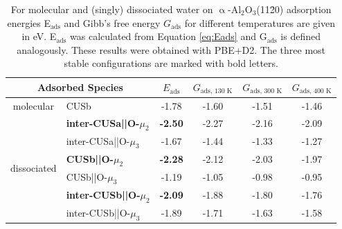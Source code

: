 \documentclass[11pt,DIV=13,BCOR=5mm,a4paper,headinclude]{scrbook}
\begin{document}
\begin{table}[!ht]
  \centering
 \caption{For molecular and (singly) dissociated water on $\upalpha$-Al$_2$O$_3$(11\=20) adsorption energies E$_\textrm{ads}$ and Gibb's free energy $G_\textrm{ads}$ for different temperatures are given in eV.
E$_\textrm{ads}$ was calculated from Equation \ref{eq:Eads} and G$_\textrm{ads}$ is defined analogously.
These results were obtained with PBE+D2.
The three most stable configurations are marked with bold letters.
\vspace*{.2cm} 
  }
  \begin{tabular}{cl|cccc}
  \toprule
   \multicolumn{2}{c|}{Adsorbed Species}  & $E_\text{ads}$ & $G_\text{ads, 130 K}$  &  $G_\text{ads, 300 K}$  & $G_\text{ads, 400 K}$ \\\midrule
\multirow{1}{*}{molecular} & CUSb          &   -1.78  &-1.60 & -1.51  & -1.46 \\\hline
 \multirow{6}{*}{dissociated} & \textbf{inter-CUSa||O-$\mu_2$} & \textbf{-2.50} &-2.27 & -2.16 & -2.09 \\
  & inter-CUSa||O-$\mu_3$ & -1.67 &-1.44 &-1.33 & -1.27 \\
  & \textbf{CUSb||O-$\mu_2$} & \textbf{-2.28} & -2.12& -2.03 &-1.97  \\
 & CUSb||O-$\mu_3$ & -1.19 &-1.05 &-0.98 & -0.95 \\%
 & \textbf{inter-CUSb||O-$\mu_2$} & \textbf{-2.09} &-1.88 &-1.80 & -1.76 \\
 & inter-CUSb||O-$\mu_3$ & -1.89 &-1.71 & -1.63 & -1.58 \\\bottomrule
  \end{tabular}
  \label{tab:ads_1water}
\end{table}
\end{document}
